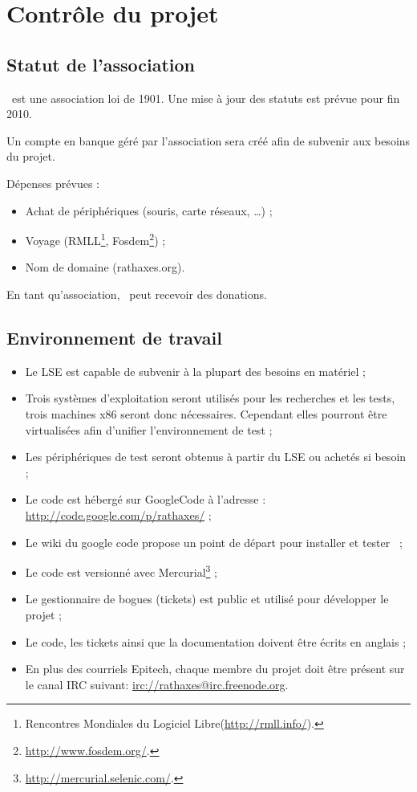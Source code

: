 \documentclass[chapterprefix=off]{rtxreport}
\begin{document}
\chapter{Contrôle du projet}

\section{Statut de l'association}

\rtx\ est une association loi de 1901. Une mise à jour des statuts est
prévue pour fin 2010.

Un compte en banque géré par l'association sera créé afin de subvenir aux
besoins du projet.

Dépenses prévues :
\begin{itemize}
\item Achat de périphériques (souris, carte réseaux, \ldots) ;
\item Voyage (RMLL\footnote{Rencontres Mondiales du Logiciel
Libre(\url{http://rmll.info/}).},
Fosdem\footnote{\url{http://www.fosdem.org/}.}) ;
\item Nom de domaine (rathaxes.org).
\end{itemize}

En tant qu'association, \rtx\ peut recevoir des donations.

\section{Environnement de travail}

\begin{itemize}
\item Le LSE est capable de subvenir à la plupart des besoins en matériel ;
\item Trois systèmes d'exploitation seront utilisés pour les recherches et les
tests, trois machines x86 seront donc nécessaires. Cependant elles pourront
être virtualisées afin d'unifier l'environnement de test ;
\item Les périphériques de test seront obtenus à partir du LSE ou achetés si
besoin ;
\item Le code est hébergé sur GoogleCode à l'adresse :
\url{http://code.google.com/p/rathaxes/} ;
\item Le wiki du google code propose un point de départ pour installer et
tester \rtx\ ;
\item Le code est versionné avec
Mercurial\footnote{\url{http://mercurial.selenic.com/}.} ;
\item Le gestionnaire de bogues (tickets) est public et utilisé pour développer
le projet ;
\item Le code, les tickets ainsi que la documentation doivent être écrits en
anglais ;
\item En plus des courriels Epitech, chaque membre du projet doit être présent
sur le canal IRC suivant: \url{irc://rathaxes@irc.freenode.org}.
\end{itemize}
\end{document}
